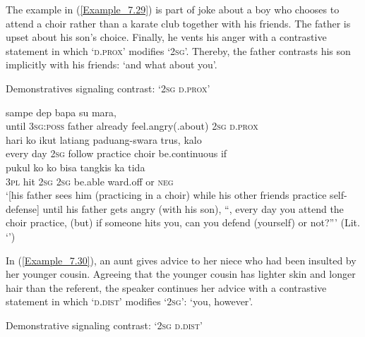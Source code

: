 {The example in (\ref{Example_7.29}) is part of joke about a boy who chooses to attend a choir rather than a karate club together with his friends. The father is upset about his son’s choice. Finally, he vents his anger with a contrastive statement in which  ‘\textsc{d.prox}’ modifies  ‘\textsc{2sg}’. Thereby, the father contrasts his son implicitly with his friends:  ‘and what about you’.


\begin{styleExampleTitle}
Demonstratives signaling contrast:  ‘\textsc{2sg} \textsc{d.prox}’
\end{styleExampleTitle}

\ea
\label{Example_7.29}
\gll {\ldots} {{sampe}} {{dep}} {{bapa}} {{su}} {{mara,}} {} {{}}\\ %
 { }   {until}  {\textsc{3sg}:\textsc{poss}}  {father}  {already}  {feel.angry(.about)}  \textsc{2sg}  {\textsc{d.prox}}\\
  hari  {ko}  {ikut}  {latiang}  {paduang-swara}  {trus,}  kalo\\
 {every}  day  {\textsc{2sg}}  {follow}  {practice}  {choir}  {be.continuous}  if\\
  {pukul}  {ko}  {ko}  {bisa}  {tangkis}  ka  {tida}\\
 {\textsc{3pl}}  {hit}  {\textsc{2sg}}  {\textsc{2sg}}  {be.able}  {ward.off}  or  {\textsc{neg}}\\
\glt 
‘[his father sees him (practicing in a choir) while his other friends practice self-defense] until his father gets angry (with his son), ``, every day you attend the choir practice, (but) if someone hits you, can you defend (yourself) or not?''' (Lit. ‘’) \textstyleExampleSource{[081109-006-JR.0001-0003]}
\z



In (\ref{Example_7.30}), an aunt gives advice to her niece who had been insulted by her younger cousin. Agreeing that the younger cousin has lighter skin and longer hair than the referent, the speaker continues her advice with a contrastive statement in which  ‘\textsc{d.dist}’ modifies  ‘\textsc{2sg}’:  ‘you, however’.


\begin{styleExampleTitle}
Demonstrative signaling contrast:  ‘\textsc{2sg} \textsc{d.dist}’
\end{styleExampleTitle}

}
